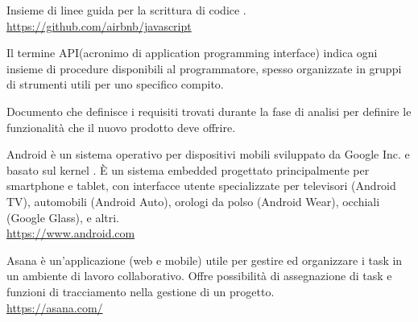 Insieme di linee guida per la scrittura di codice .\\
\url{https://github.com/airbnb/javascript}

Il termine API(acronimo di application programming interface) indica ogni insieme di procedure disponibili al programmatore, spesso organizzate in gruppi di strumenti utili per uno specifico compito.

Documento che definisce i requisiti trovati durante la fase di analisi per definire le funzionalit\`a che il nuovo prodotto deve offrire.

Android è un sistema operativo per dispositivi mobili sviluppato da Google Inc. e basato sul kernel . \`{E} un sistema embedded progettato principalmente per smartphone e tablet, con interfacce utente specializzate per televisori (Android TV), automobili (Android Auto), orologi da polso (Android Wear), occhiali (Google Glass), e altri.\\
\url{https://www.android.com}

Asana è un’applicazione (web e mobile) utile per gestire ed organizzare i task in un ambiente di lavoro collaborativo. Offre possibilità di assegnazione di task e funzioni di tracciamento nella gestione di un progetto.\\
\url{https://asana.com/}
\clearpage